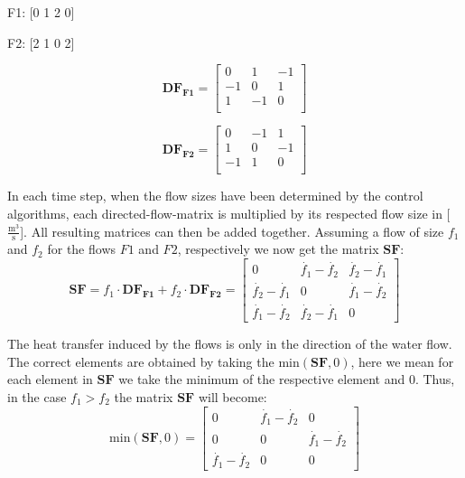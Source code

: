 F1: [0 1 2 0]

F2: [2 1 0 2]

\begin{equation}
	\mathbf{DF_{F1}} = 
	\begin{bmatrix}
		0 & 1 &-1  \\
	   -1 & 0 & 1  \\
		1 &-1 & 0  \\
	\end{bmatrix}
	\label{eq:DFflow1}
\end{equation}

\begin{equation}
	\mathbf{DF_{F2}} = 
	\begin{bmatrix}
		0 &-1 & 1  \\
	    1 & 0 &-1  \\
	   -1 & 1 & 0  \\
	\end{bmatrix}
	\label{eq:DFflow1}
\end{equation}

In each time step, when the flow sizes have been determined by the control algorithms, each directed-flow-matrix is multiplied by its respected flow size in [$\frac{\text{m}^3}{\text{s}}$]. All resulting matrices can then be added together. Assuming a flow of size $f_1$ and $f_2$ for the flows $F1$ and $F2$, respectively we now get the matrix $\mathbf{SF}$:
\begin{equation}
	\mathbf{SF} = f_1 \cdot \mathbf{DF_{F1}} + f_2 \cdot \mathbf{DF_{F2}} = 
	\begin{bmatrix}
		0     & \dot{f_1}-\dot{f_2} & \dot{f_2}-\dot{f_1} \\
    \dot{ f_2}-\dot{f_1}  & 0       & \dot{f_1}-\dot{f_2} \\
     \dot{f_1}-\dot{f_2}  & \dot{f_2}-\dot{f_1} & 0       
	\end{bmatrix}
	\label{eq:addbufferflows}
\end{equation}

The heat transfer induced by the flows is only in the direction of the water flow. The correct elements are obtained by taking the $\text{min}(\mathbf{SF},0)$, here we mean for each element in $\mathbf{SF}$ we take the minimum of the respective element and 0. Thus, in the case $f_1>f_2$ the matrix $\mathbf{SF}$ will become:
\begin{equation}
	\text{min}(\mathbf{SF},0) =  \begin{bmatrix}
		0     & \dot{f_1}-\dot{f_2} & 0 \\
        0     & 0       & \dot{f_1}-\dot{f_2} \\
     \dot{f_1}-\dot{f_2}  & 0       & 0     
	\end{bmatrix}
	\label{eq:minSFzero}
\end{equation}

